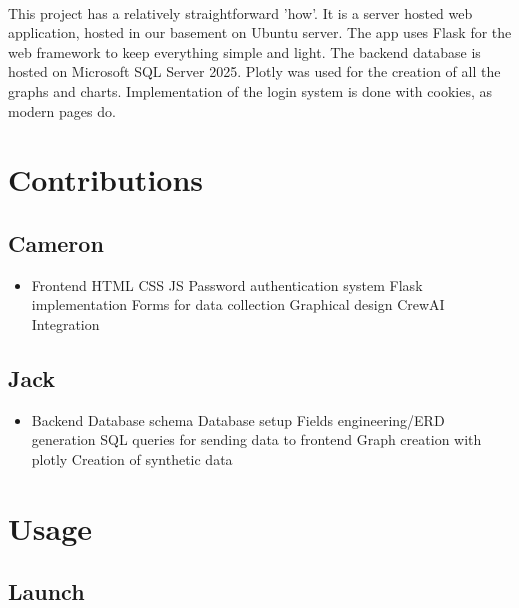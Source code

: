 \documentclass{article}
\begin{document}
			\paragraph{} This project has a relatively straightforward 'how'. It is a server hosted web application, hosted in our basement on Ubuntu server. The app uses Flask for the web framework to keep everything simple and light. The backend database is hosted on Microsoft SQL Server 2025. Plotly was used for the creation of all the graphs and charts. Implementation of the login system is done with cookies, as modern pages do.
	
	\section*{Contributions}
	
		\subsection*{Cameron}
		
			\begin{itemize}
				\item Frontend
					\subitem HTML
					\subitem CSS
					\subitem JS
					\subitem Password authentication system
					\subitem Flask implementation
					\subitem Forms for data collection
					\subitem Graphical design
					\subitem CrewAI Integration
			\end{itemize}
		
		\subsection*{Jack}
		
			\begin{itemize}
				\item Backend
					\subitem Database schema
					\subitem Database setup
					\subitem Fields engineering/ERD generation
					\subitem SQL queries for sending data to frontend
					\subitem Graph creation with plotly
					\subitem Creation of synthetic data
			\end{itemize}
	
	\section*{Usage}
	
		\subsection*{Launch}
		
\end{document}
